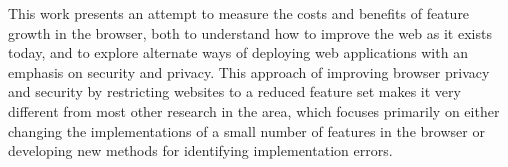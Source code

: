 This work presents an attempt to measure the costs and benefits of feature
growth in the browser, both to understand how to improve the web as it exists
today, and to explore alternate ways of deploying web applications with
an emphasis on security and privacy.  This approach of improving browser
privacy and security by restricting websites to a reduced feature set
makes it very different from most other research in the area, which focuses
primarily on either changing the implementations of a small number of features
in the browser or developing new methods for identifying implementation errors.





